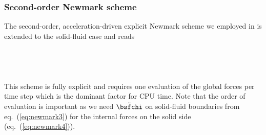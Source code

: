 \subsubsection{Second-order Newmark scheme}
%
The second-order, acceleration-driven explicit Newmark scheme we employed in 
\citet{nissen+:07b} is extended to the solid-fluid case and reads 
\citep{manu03}
\eqa 
{}\label{eq:newmark1}\\
\label{eq:newmark2}\\
\label{eq:newmark3}\\
\label{eq:newmark4}\\
\label{eq:newmark5}\\
\label{eq:newmark6}
\ena
%
This scheme is fully explicit and requires one evaluation of the global 
forces per time step which is the dominant factor for CPU time. Note that the 
order of evaluation is important as we need $\ddot{\bsfchi}$ on 
solid-fluid boundaries from eq.~(\ref{eq:newmark3})
for the internal forces on the solid side (eq.~(\ref{eq:newmark4})).
%
